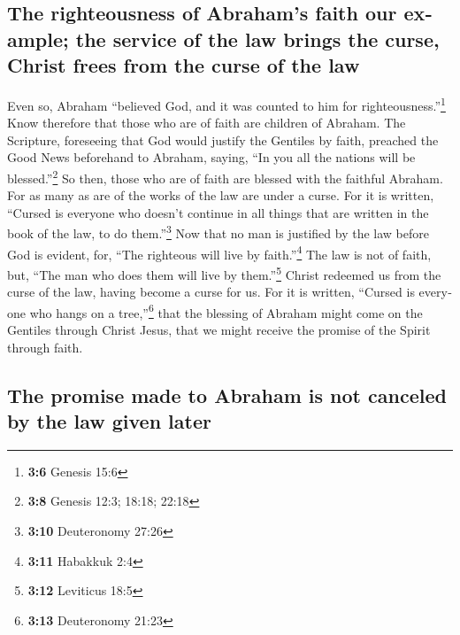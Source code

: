 \begin{paracol}{2}
\begin{otherlanguage}{english}
\hypertarget{the-righteousness-of-abrahams-faith-our-example-the-service-of-the-law-brings-the-curse-christ-frees-from-the-curse-of-the-law}{%
\subsection{The righteousness of Abraham's faith our example; the
service of the law brings the curse, Christ frees from the curse of the
law}\label{the-righteousness-of-abrahams-faith-our-example-the-service-of-the-law-brings-the-curse-christ-frees-from-the-curse-of-the-law}}

 Even so, Abraham ``believed God, and it was counted to
him for righteousness.''\footnote{\textbf{3:6} Genesis 15:6}
 Know therefore that those who are of faith are children
of Abraham.  The Scripture, foreseeing that God would
justify the Gentiles by faith, preached the Good News beforehand to
Abraham, saying, ``In you all the nations will be blessed.''\footnote{\textbf{3:8}
  Genesis 12:3; 18:18; 22:18}  So then, those who are of
faith are blessed with the faithful Abraham.  For as many
as are of the works of the law are under a curse. For it is written,
``Cursed is everyone who doesn't continue in all things that are written
in the book of the law, to do them.''\footnote{\textbf{3:10} Deuteronomy
  27:26}  Now that no man is justified by the law before
God is evident, for, ``The righteous will live by faith.''\footnote{\textbf{3:11}
  Habakkuk 2:4}  The law is not of faith, but, ``The man
who does them will live by them.''\footnote{\textbf{3:12} Leviticus 18:5}
 Christ redeemed us from the curse of the law, having
become a curse for us. For it is written, ``Cursed is everyone who hangs
on a tree,''\footnote{\textbf{3:13} Deuteronomy 21:23} 
that the blessing of Abraham might come on the Gentiles through Christ
Jesus, that we might receive the promise of the Spirit through faith.

\hypertarget{the-promise-made-to-abraham-is-not-canceled-by-the-law-given-later}{%
\subsection{The promise made to Abraham is not canceled by the law given
later}\label{the-promise-made-to-abraham-is-not-canceled-by-the-law-given-later}}


\end{otherlanguage}
\end{paracol}
